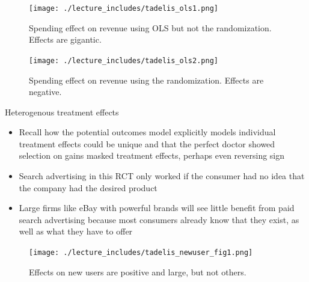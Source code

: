 \documentclass{beamer}
\begin{document}
\begin{frame}

\begin{figure}
\begin{center}
\texttt{[image: ./lecture\_includes/tadelis\_ols1.png]}
\caption{Spending effect on revenue using OLS but not the randomization. Effects are gigantic. }
\end{center}
\end{figure}

\end{frame}

\begin{frame}

\begin{figure}
\begin{center}
\texttt{[image: ./lecture\_includes/tadelis\_ols2.png]}
\caption{Spending effect on revenue using the randomization. Effects are negative. }
\end{center}
\end{figure}

\end{frame}

\begin{frame}{Heterogenous treatment effects}

\begin{itemize}
\item Recall how the potential outcomes model explicitly models individual treatment effects could be unique and that the perfect doctor showed selection on gains masked treatment effects, perhaps even reversing sign
\item Search advertising in this RCT only worked if the consumer had no idea that the company had the desired product
\item Large firms like eBay with powerful brands will see little benefit from paid search advertising because most consumers already know that they exist, as well as what they have to offer
\end{itemize}

\end{frame}


\begin{frame}

\begin{figure}
\begin{center}
\texttt{[image: ./lecture\_includes/tadelis\_newuser\_fig1.png]}
\caption{Effects on new users are positive and large, but not others. }
\end{center}
\end{figure}

\end{frame}
\end{document}

